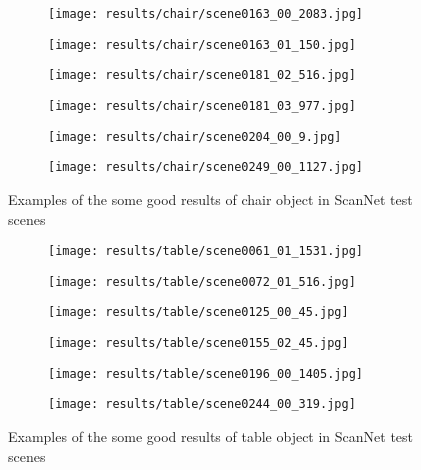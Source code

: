\begin{figure}[h!]
  \begin{subfigure}[b]{0.32\linewidth}
    \texttt{[image: results/chair/scene0163\_00\_2083.jpg]}
  \end{subfigure}
  \begin{subfigure}[b]{0.32\linewidth}
    \texttt{[image: results/chair/scene0163\_01\_150.jpg]}
  \end{subfigure}
  \begin{subfigure}[b]{0.32\linewidth}
    \texttt{[image: results/chair/scene0181\_02\_516.jpg]}
  \end{subfigure}
  \begin{subfigure}[b]{0.32\linewidth}
    \texttt{[image: results/chair/scene0181\_03\_977.jpg]}
  \end{subfigure}
  \begin{subfigure}[b]{0.32\linewidth}
    \texttt{[image: results/chair/scene0204\_00\_9.jpg]}
  \end{subfigure}
  \begin{subfigure}[b]{0.32\linewidth}
    \texttt{[image: results/chair/scene0249\_00\_1127.jpg]}
  \end{subfigure}
  \caption{Examples of the some good results of chair object in ScanNet test scenes}
  \label{fig:result_chair}
\end{figure}

\begin{figure}[h!]
  \centering
  \begin{subfigure}[b]{0.32\linewidth}
    \texttt{[image: results/table/scene0061\_01\_1531.jpg]}
  \end{subfigure}
  \begin{subfigure}[b]{0.32\linewidth}
    \texttt{[image: results/table/scene0072\_01\_516.jpg]}
  \end{subfigure}
  \begin{subfigure}[b]{0.32\linewidth}
    \texttt{[image: results/table/scene0125\_00\_45.jpg]}
  \end{subfigure}
  \begin{subfigure}[b]{0.32\linewidth}
    \texttt{[image: results/table/scene0155\_02\_45.jpg]}
  \end{subfigure}
  \begin{subfigure}[b]{0.32\linewidth}
    \texttt{[image: results/table/scene0196\_00\_1405.jpg]}
  \end{subfigure}
  \begin{subfigure}[b]{0.32\linewidth}
    \texttt{[image: results/table/scene0244\_00\_319.jpg]}
  \end{subfigure}
  \caption{Examples of the some good results of table object in ScanNet test scenes}
  \label{fig:result_table}
\end{figure}